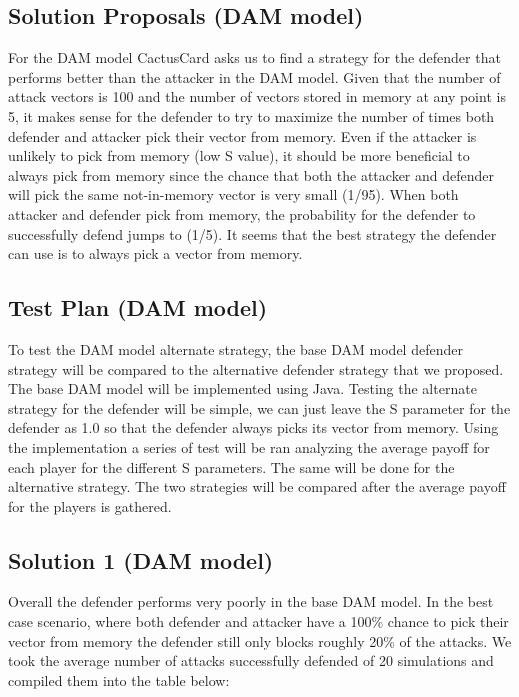 \documentclass[11pt,journal]{IEEEtran}
\begin{document}
\subsection{Solution Proposals (DAM model)}
For the DAM model CactusCard asks us to find a strategy for the defender that performs better than the attacker in the DAM model. Given that the number of attack vectors is 100 and the number of vectors stored in memory at any point is 5, it makes sense for the defender to try to maximize the number of times both defender and attacker pick their vector from memory. Even if the attacker is unlikely to pick from memory (low S value), it should be more beneficial to always pick from memory since the chance that both the attacker and defender will pick the same not-in-memory vector is very small (1/95). When both attacker and defender pick from memory, the probability for the defender to successfully defend jumps to (1/5). It seems that the best strategy the defender can use is to always pick a vector from memory. 

\subsection{Test Plan (DAM model)}
To test the DAM model alternate strategy, the base DAM model defender strategy will be compared to the alternative defender strategy that we proposed. The base DAM model will be implemented using Java. Testing the alternate strategy for the defender will be simple, we can just leave the S parameter for the defender as 1.0 so that the defender always picks its vector from memory. Using the implementation a series of test will be ran analyzing the average payoff for each player for the different S parameters. The same will be done for the alternative strategy. The two strategies will be compared after the average payoff for the players is gathered.

\subsection{Solution 1 (DAM model)}
Overall the defender performs very poorly in the base DAM model. In the best case scenario, where both defender and attacker have a 100\% chance to pick their vector from memory the defender still only blocks roughly 20\% of the attacks. We took the average number of attacks successfully defended of 20 simulations and compiled them into the table below:
\end{document}
